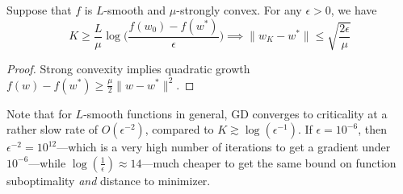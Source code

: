	\begin{corollary}
	  \label{thm:linear-convergence-of-distance-to-minimizer-on}
	  Suppose that $f$ is $L$-smooth and $\mu$-strongly convex. For any $\epsilon > 0$, we have 
		\begin{equation}
			K \geq \frac{L}{\mu} \log \bigg( \frac{f(w_0) - f(w^\ast)}{\epsilon} \bigg) \implies \|w_K - w^\ast\| \leq \sqrt{\frac{2 \epsilon}{\mu}}
		\end{equation}
	\end{corollary}
	\begin{proof}
		Strong convexity implies quadratic growth $f(w) - f(w^\ast) \geq \frac{\mu}{2}\|w - w^\ast\|^2$. 
	\end{proof}

	Note that for $L$-smooth functions in general, GD converges to criticality at a rather slow rate of $O(\epsilon^{-2})$, compared to $K \gtrsim \log(\epsilon^{-1})$. If $\epsilon = 10^{-6}$, then $\epsilon^{-2} = 10^{12}$---which is a very high number of iterations to get a gradient under $10^{-6}$---while $\log(\frac{1}{\epsilon}) \approx 14$---much cheaper to get the same bound on function suboptimality \textit{and} distance to minimizer. 

